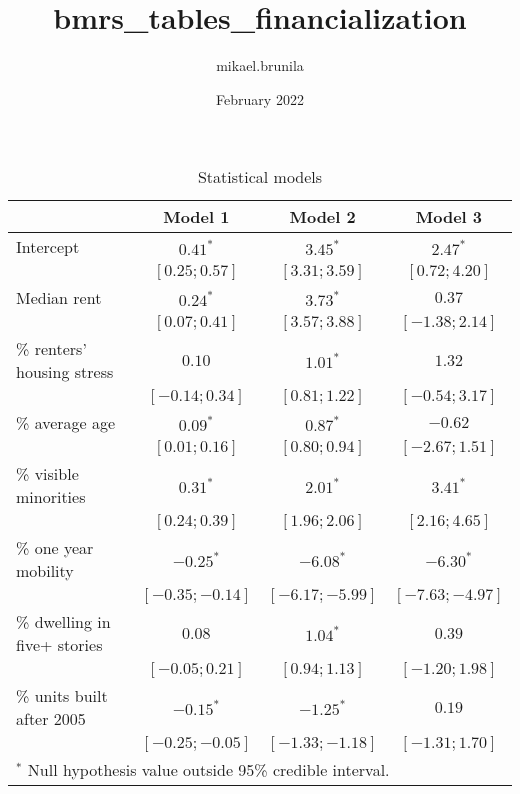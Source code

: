 \documentclass{article}
\title{bmrs_tables_financialization}
\author{mikael.brunila }
\date{February 2022}
\begin{document}

\begin{table}
\begin{center}
\begin{tabular}{l c c c}
\hline
 & Model 1 & Model 2 & Model 3 \\
\hline
Intercept                    & $0.41^{*}$        & $3.45^{*}$        & $2.47^{*}$        \\
                             & $ [ 0.25;  0.57]$ & $ [ 3.31;  3.59]$ & $ [ 0.72;  4.20]$ \\
Median rent                  & $0.24^{*}$        & $3.73^{*}$        & $0.37$            \\
                             & $ [ 0.07;  0.41]$ & $ [ 3.57;  3.88]$ & $ [-1.38;  2.14]$ \\
\% renters' housing stress   & $0.10$            & $1.01^{*}$        & $1.32$            \\
                             & $ [-0.14;  0.34]$ & $ [ 0.81;  1.22]$ & $ [-0.54;  3.17]$ \\
\% average age               & $0.09^{*}$        & $0.87^{*}$        & $-0.62$           \\
                             & $ [ 0.01;  0.16]$ & $ [ 0.80;  0.94]$ & $ [-2.67;  1.51]$ \\
\% visible minorities        & $0.31^{*}$        & $2.01^{*}$        & $3.41^{*}$        \\
                             & $ [ 0.24;  0.39]$ & $ [ 1.96;  2.06]$ & $ [ 2.16;  4.65]$ \\
\% one year mobility         & $-0.25^{*}$       & $-6.08^{*}$       & $-6.30^{*}$       \\
                             & $ [-0.35; -0.14]$ & $ [-6.17; -5.99]$ & $ [-7.63; -4.97]$ \\
\% dwelling in five+ stories & $0.08$            & $1.04^{*}$        & $0.39$            \\
                             & $ [-0.05;  0.21]$ & $ [ 0.94;  1.13]$ & $ [-1.20;  1.98]$ \\
\% units built after 2005    & $-0.15^{*}$       & $-1.25^{*}$       & $0.19$            \\
                             & $ [-0.25; -0.05]$ & $ [-1.33; -1.18]$ & $ [-1.31;  1.70]$ \\
\hline
\multicolumn{4}{l}{\scriptsize{$^*$ Null hypothesis value outside 95\% credible interval.}}
\end{tabular}
\caption{Statistical models}
\label{table:coefficients}
\end{center}
\end{table}
\end{document}
